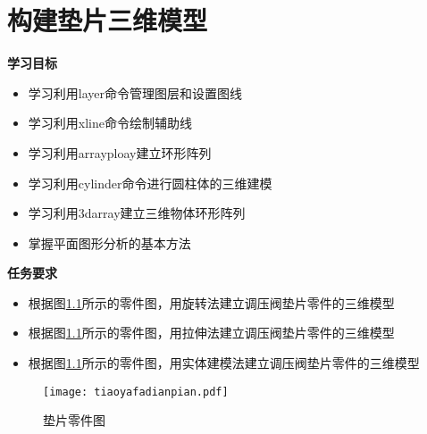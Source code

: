 \chapter{构建垫片三维模型}\label{chap:dianpian}

{\bfseries 学习目标}
\begin{itemize}
\item 学习利用layer命令管理图层和设置图线
\item 学习利用xline命令绘制辅助线
\item 学习利用arrayploay建立环形阵列
\item 学习利用cylinder命令进行圆柱体的三维建模
\item 学习利用3darray建立三维物体环形阵列
\item 掌握平面图形分析的基本方法
\end{itemize}

{\bfseries 任务要求}
\begin{itemize}
\item 根据图\ref{fig:tiaoyafadianpian}所示的零件图，用旋转法建立调压阀垫片零件的三维模型
\item 根据图\ref{fig:tiaoyafadianpian}所示的零件图，用拉伸法建立调压阀垫片零件的三维模型
\item 根据图\ref{fig:tiaoyafadianpian}所示的零件图，用实体建模法建立调压阀垫片零件的三维模型
\end{itemize}

\noindent
\begin{figure}[htbp]
\centering
\texttt{[image: tiaoyafadianpian.pdf]}
\caption{垫片零件图}\label{fig:tiaoyafadianpian}
\end{figure}

\endinput